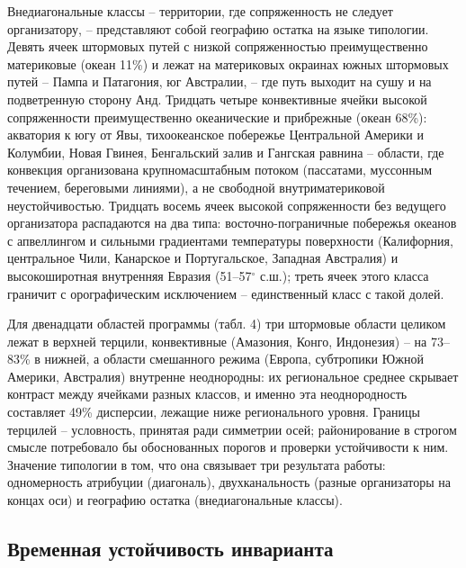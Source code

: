\documentclass[12pt,a4paper]{article}
\begin{document}
Внедиагональные классы -- территории, где сопряженность не следует организатору, -- представляют собой географию остатка на языке типологии. Девять ячеек штормовых путей с низкой сопряженностью преимущественно материковые (океан 11\%) и лежат на материковых окраинах южных штормовых путей -- Пампа и Патагония, юг Австралии, -- где путь выходит на сушу и на подветренную сторону Анд. Тридцать четыре конвективные ячейки высокой сопряженности преимущественно океанические и прибрежные (океан 68\%): акватория к югу от Явы, тихоокеанское побережье Центральной Америки и Колумбии, Новая Гвинея, Бенгальский залив и Гангская равнина -- области, где конвекция организована крупномасштабным потоком (пассатами, муссонным течением, береговыми линиями), а не свободной внутриматериковой неустойчивостью. Тридцать восемь ячеек высокой сопряженности без ведущего организатора распадаются на два типа: восточно-пограничные побережья океанов с апвеллингом и сильными градиентами температуры поверхности (Калифорния, центральное Чили, Канарское и Португальское, Западная Австралия) и высокоширотная внутренняя Евразия (51--57$^\circ$ с.ш.); треть ячеек этого класса граничит с орографическим исключением -- единственный класс с такой долей.

Для двенадцати областей программы (табл. 4) три штормовые области целиком лежат в верхней терцили, конвективные (Амазония, Конго, Индонезия) -- на 73--83\% в нижней, а области смешанного режима (Европа, субтропики Южной Америки, Австралия) внутренне неоднородны: их региональное среднее скрывает контраст между ячейками разных классов, и именно эта неоднородность составляет 49\% дисперсии, лежащие ниже регионального уровня. Границы терцилей -- условность, принятая ради симметрии осей; районирование в строгом смысле потребовало бы обоснованных порогов и проверки устойчивости к ним. Значение типологии в том, что она связывает три результата работы: одномерность атрибуции (диагональ), двухканальность (разные организаторы на концах оси) и географию остатка (внедиагональные классы).

\subsection{Временная устойчивость инварианта}
\end{document}

